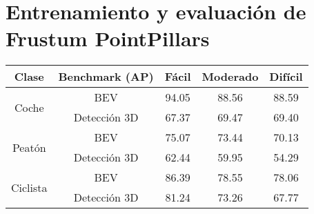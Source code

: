 \section{Entrenamiento y evaluación de Frustum PointPillars}
\label{sec:Entrenamiento y evaluación de Frustum PointPillars}

\begin{table}[H]
\centering
\begin{tabular}{|c|c|c|c|c|}
\hline
\textbf{Clase} & \textbf{Benchmark (AP)} & \textbf{Fácil} & \textbf{Moderado} & \textbf{Difícil} \\ \hline \hline
\multirow{2}{*}{Coche}    & BEV          & 94.05 & 88.56 & 88.59 \\ \cline{2-5} 
                          & Detección 3D & 67.37 & 69.47 & 69.40 \\ \hline
\multirow{2}{*}{Peatón}   & BEV          & 75.07 & 73.44 & 70.13 \\ \cline{2-5} 
                          & Detección 3D & 62.44 & 59.95 & 54.29 \\ \hline
\multirow{2}{*}{Ciclista} & BEV          & 86.39 & 78.55 & 78.06 \\ \cline{2-5} 
                          & Detección 3D & 81.24 & 73.26 & 67.77 \\ \hline
\end{tabular}
\end{table}